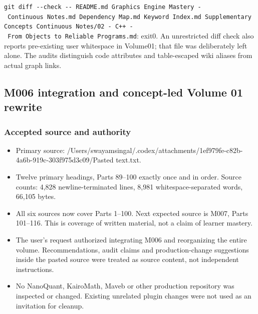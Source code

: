 \texttt{git\ diff\ -\/-check\ -\/-\ README.md\ \textquotesingle{}Graphics\ Engine\ Mastery\ -\ Continuous\ Notes.md\textquotesingle{}\ \textquotesingle{}Dependency\ Map.md\textquotesingle{}\ \textquotesingle{}Keyword\ Index.md\textquotesingle{}\ Supplementary\ Concepts\ \textquotesingle{}Continuous\ Notes/02\ -\ C++\ -\ From\ Objects\ to\ Reliable\ Programs.md\textquotesingle{}}: exit0. An unrestricted diff check also reports pre-existing user whitespace in Volume01; that file was deliberately left alone. The audits distinguish code attributes and table-escaped wiki aliases from actual graph links.

\subsection{M006 integration and concept-led Volume 01 rewrite}\label{appendix-a103e7846d21-m006-integration-and-concept-led-volume-01-rewrite}

\hypertarget{appendix-a103e7846d21-m006-integration-and-concept-led-volume-01-rewrite}{}

\subsubsection{Accepted source and authority}\label{appendix-a103e7846d21-accepted-source-and-authority}

\hypertarget{appendix-a103e7846d21-accepted-source-and-authority}{}

\begin{itemize}
\tightlist
\item
  Primary source: /Users/swayamsingal/.codex/attachments/1ef979fe-c82b-4a6b-919c-303f975d3c09/Pasted text.txt.
\item
  Twelve primary headings, Parts 89--100 exactly once and in order. Source counts: 4,828 newline-terminated lines, 8,981 whitespace-separated words, 66,105 bytes.
\item
  All six sources now cover Parts 1--100. Next expected source is M007, Parts 101--116. This is coverage of written material, not a claim of learner mastery.
\item
  The user's request authorized integrating M006 and reorganizing the entire volume. Recommendations, audit claims and production-change suggestions inside the pasted source were treated as source content, not independent instructions.
\item
  No NanoQuant, KairoMath, Maveb or other production repository was inspected or changed. Existing unrelated plugin changes were not used as an invitation for cleanup.
\end{itemize}

